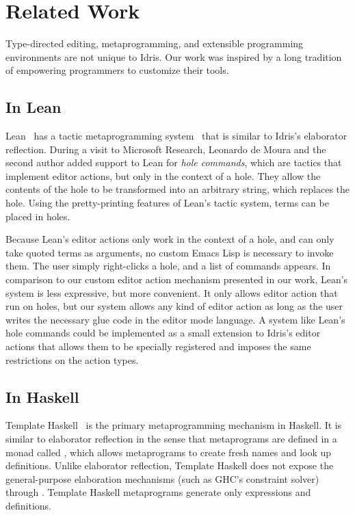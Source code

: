 \section{Related Work} \label{sec:relatedwork}


Type-directed editing, metaprogramming, and extensible programming
environments are not unique to Idris. Our work was inspired by a long
tradition of empowering programmers to customize their tools.

\subsection{In Lean}


Lean~\cite{lean} has a tactic metaprogramming system~\cite{leanmeta}
that is similar to Idris's elaborator reflection.  During a visit to
Microsoft Research, Leonardo de Moura and the second author added
support to Lean for \emph{hole commands}, which are tactics that implement
editor actions, but only in the context of a hole. They allow the
contents of the hole to be transformed into an arbitrary string, which
replaces the hole. Using the pretty-printing features of Lean's tactic
system, terms can be placed in holes.

Because Lean's editor actions only work in the context of a hole, and
can only take quoted terms as arguments, no custom Emacs Lisp is necessary to
invoke them. The user simply right-clicks a hole, and a list of
commands appears.  In comparison to our custom editor action mechanism
presented in our work, Lean's system is less expressive, but more
convenient.  It only allows editor action that run on holes, but our
system allows any kind of editor action as long as the user writes the
necessary glue code in the editor mode language.
A system like Lean's hole commands could be implemented as a small
extension to Idris's editor actions that allows them to be specially
registered and imposes the same restrictions on the action types.

\subsection{In Haskell}

Template Haskell~\cite{th} is the primary metaprogramming mechanism in
Haskell.  It is similar to elaborator reflection in the sense that
metaprograms are defined in a monad called , which allows
metaprograms to create fresh names and look up definitions.  Unlike
elaborator reflection, Template Haskell does not expose the
general-purpose elaboration mechanisms (such as GHC's constraint
solver) through .  Template Haskell metaprograms generate only
expressions and definitions.

